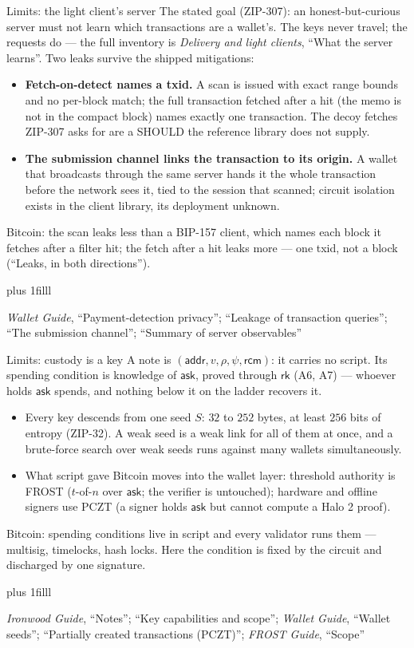 \documentclass[aspectratio=169,11pt]{beamer}
\newcommand{\rksym}{\ensuremath{\mathsf{rk}}}
\newcommand{\asksym}{\ensuremath{\mathsf{ask}}}
\newcommand{\rcm}{\ensuremath{\mathsf{rcm}}}
\newcommand{\src}[1]{\par\vskip0pt plus 1filll
  {\fontsize{6}{7.2}\selectfont\color{arbdim}\raggedright #1\par}}
\begin{document}
\begin{frame}{Limits: the light client's server}
The stated goal (ZIP-307): an honest-but-curious server must not learn
which transactions are a wallet's. The keys never travel; the requests do
--- the full inventory is \emph{Delivery and light clients}, ``What the
server learns''. Two leaks survive the shipped mitigations:
\begin{itemize}
  \item \textbf{Fetch-on-detect names a txid.} A scan is issued with exact
    range bounds and no per-block match; the full transaction fetched
    after a hit (the memo is not in the compact block) names exactly one
    transaction. The decoy fetches ZIP-307 asks for are a SHOULD the
    reference library does not supply.
  \item \textbf{The submission channel links the transaction to its
    origin.} A wallet that broadcasts through the same server hands it
    the whole transaction before the network sees it, tied to the session
    that scanned; circuit isolation exists in the client library, its
    deployment unknown.
\end{itemize}
\alert{Bitcoin:} the scan leaks less than a BIP-157 client, which names
each block it fetches after a filter hit; the fetch after a hit leaks
more --- one txid, not a block (``Leaks, in both directions'').
\src{\emph{Wallet Guide}, ``Payment-detection privacy''; ``Leakage of
  transaction queries''; ``The submission channel''; ``Summary of server
  observables''}
\end{frame}

\begin{frame}{Limits: custody is a key}
A note is $(\mathsf{addr}, v, \rho, \psi, \rcm)$: it carries no script.
Its spending condition is knowledge of \asksym, proved through \rksym{}
(A6, A7) --- whoever holds \asksym{} spends, and nothing below it on the
ladder recovers it.
\begin{itemize}
  \item Every key descends from one seed $S$: $32$ to $252$ bytes, at
    least $256$ bits of entropy (ZIP-32). A weak seed is a weak link for
    all of them at once, and a brute-force search over weak seeds runs
    against many wallets simultaneously.
  \item What script gave Bitcoin moves into the wallet layer: threshold
    authority is FROST ($t$-of-$n$ over \asksym; the verifier is
    untouched); hardware and offline signers use PCZT (a signer holds
    \asksym{} but cannot compute a Halo 2 proof).
\end{itemize}
\alert{Bitcoin:} spending conditions live in script and every validator
runs them --- multisig, timelocks, hash locks. Here the condition is
fixed by the circuit and discharged by one signature.
\src{\emph{Ironwood Guide}, ``Notes''; ``Key capabilities and scope'';
\emph{Wallet Guide}, ``Wallet seeds''; ``Partially created transactions
(PCZT)''; \emph{FROST Guide}, ``Scope''}
\end{frame}
\end{document}
